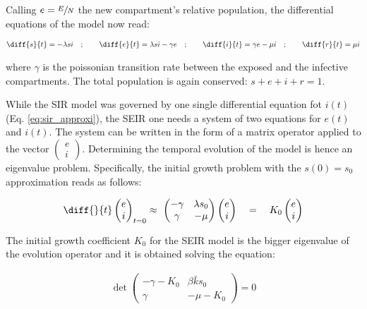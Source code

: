 \documentclass[DIV=12, BCOR=0pt]{scrartcl}  %
\begin{document}
  Calling $e = \sfrac{E}{N}$ the new compartment's relative population, the differential equations of the model now read:
  
  \begin{align}
  	\diff{s}{t} = - \lambda s i \quad;  \qquad 	\diff{e}{t} = \lambda s i - \gamma e \quad; \qquad \diff{i}{t} = \gamma e - \mu i \quad; \qquad \diff{r}{t} = \mu i
  	\label{eq:seir}
  \end{align}

  where $\gamma$ is the poissonian transition rate between the exposed and the infective compartments. The total population is again conserved: $ s + e + i + r = 1$.
  
  While the SIR model was governed by one single differential equation fot $i(t)$ (Eq. \ref{eq:sir_approxi}), the SEIR one needs a system of two equations for $e(t)$ and $i(t)$.
  The system can be written in the form of a matrix operator applied to the vector $ \left( \begin{smallmatrix} e \\	i \end{smallmatrix} \right)$. Determining the temporal evolution of the model is hence an eigenvalue problem. Specifically, the initial growth problem with the $s(0) = s_0$ approximation reads as follows: 
  
  \begin{align}
  	\diff{}{t}
  	\begin{pmatrix}
  			e \\
  			i
  	\end{pmatrix}_{t=0}
  	\approx \
  	\begin{pmatrix}
  		 - \gamma & \lambda s_0\\
  		 \gamma & - \mu
  	\end{pmatrix}
  	\begin{pmatrix}
  		e \\
  		i
  	\end{pmatrix}
	  \quad = \quad K_0 %
	  \begin{pmatrix}
	  	e \\
	  	i
	  \end{pmatrix} %
		\label{eq:seir_approxi}
	\end{align}

The initial growth coefficient $K_0$ for the SEIR model is the bigger eigenvalue of the evolution operator and it is obtained solving the equation: 

	\begin{align}
		\det 
		\begin{pmatrix}
			- \gamma - K_0 & \beta \bar{k} s_0\\ %
			\gamma & - \mu - K_0  %
		\end{pmatrix} = 0
	\label{eq:seir_K0}
	\end{align}
 
\end{document}
